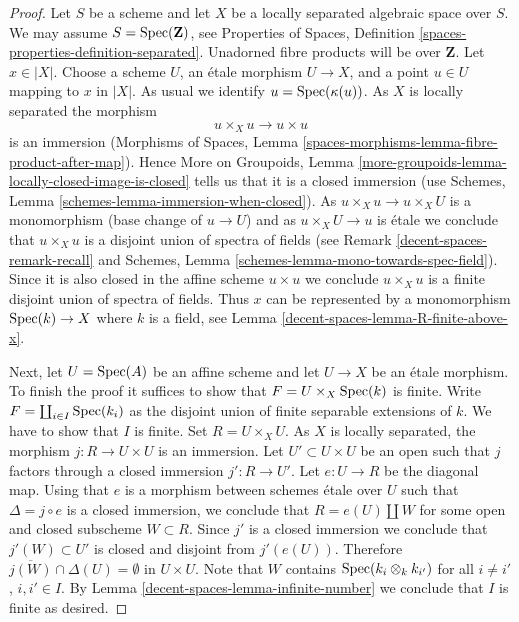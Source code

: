 \begin{proof}
Let $S$ be a scheme and let $X$ be a locally separated algebraic space
over $S$. We may assume $S = \operatorname{Spec}(\mathbf{Z})$, see
Properties of Spaces, Definition \ref{spaces-properties-definition-separated}.
Unadorned fibre products will be over $\mathbf{Z}$.
Let $x \in |X|$. Choose a scheme $U$, an \'etale
morphism $U \to X$, and a point $u \in U$ mapping to $x$ in $|X|$.
As usual we identify $u = \operatorname{Spec}(\kappa(u))$.
As $X$ is locally separated the morphism
$$
u \times_X u \to u \times u
$$
is an immersion (Morphisms of Spaces, Lemma
\ref{spaces-morphisms-lemma-fibre-product-after-map}).
Hence More on Groupoids, Lemma
\ref{more-groupoids-lemma-locally-closed-image-is-closed}
tells us that it is a closed immersion (use
Schemes, Lemma \ref{schemes-lemma-immersion-when-closed}).
As $u \times_X u \to u \times_X U$ is a monomorphism (base change
of $u \to U$) and as $u \times_X U \to u$ is \'etale we conclude that
$u \times_X u$ is a disjoint union of spectra of fields
(see Remark \ref{decent-spaces-remark-recall} and
Schemes, Lemma \ref{schemes-lemma-mono-towards-spec-field}).
Since it is also closed in the affine scheme $u \times u$ we
conclude $u \times_X u$ is a finite disjoint union of spectra of fields.
Thus $x$ can be represented by a monomorphism $\operatorname{Spec}(k) \to X$ where $k$
is a field, see
Lemma \ref{decent-spaces-lemma-R-finite-above-x}.

\medskip\noindent
Next, let $U = \operatorname{Spec}(A)$ be an affine scheme and let $U \to X$ be an
\'etale morphism. To finish the proof it suffices to show that
$F = U \times_X \operatorname{Spec}(k)$ is finite. Write $F = \coprod_{i \in I} \operatorname{Spec}(k_i)$
as the disjoint union of finite separable extensions of $k$.
We have to show that $I$ is finite.
Set $R = U \times_X U$. As $X$ is locally separated, the morphism
$j : R \to U \times U$ is an immersion. Let $U' \subset U \times U$
be an open such that $j$ factors through a closed immersion $j' : R \to U'$.
Let $e : U \to R$ be the diagonal map. Using that $e$ is a morphism between
schemes \'etale over $U$ such that $\Delta = j \circ e$ is a
closed immersion, we conclude that $R = e(U) \amalg W$ for some
open and closed subscheme $W \subset R$. Since $j'$ is a closed immersion
we conclude that $j'(W) \subset U'$ is closed and disjoint from
$j'(e(U))$. Therefore
$\overline{j(W)} \cap \Delta(U) = \emptyset$ in $U \times U$.
Note that $W$ contains $\operatorname{Spec}(k_i \otimes_k k_{i'})$ for all
$i \not = i'$, $i, i' \in I$. By Lemma \ref{decent-spaces-lemma-infinite-number}
we conclude that $I$ is finite as desired.
\end{proof}

